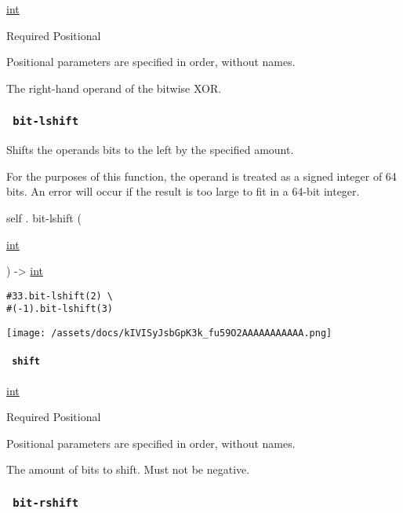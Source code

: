 \href{/docs/reference/foundations/int/}{int}

{Required} {{ Positional }}

\label{definitions-bit-xor-rhs-positional-tooltip}
Positional parameters are specified in order, without names.

The right-hand operand of the bitwise XOR.

\subsubsection{\texorpdfstring{\texttt{\ bit-lshift\ }}{ bit-lshift }}\label{definitions-bit-lshift}

Shifts the operand\textquotesingle s bits to the left by the specified
amount.

For the purposes of this function, the operand is treated as a signed
integer of 64 bits. An error will occur if the result is too large to
fit in a 64-bit integer.

self { . } { bit-lshift } (

{ \href{/docs/reference/foundations/int/}{int} }

) -\textgreater{} \href{/docs/reference/foundations/int/}{int}

\begin{verbatim}
#33.bit-lshift(2) \
#(-1).bit-lshift(3)
\end{verbatim}

\texttt{[image: /assets/docs/kIVISyJsbGpK3k\_fu59O2AAAAAAAAAAA.png]}

\paragraph{\texorpdfstring{\texttt{\ shift\ }}{ shift }}\label{definitions-bit-lshift-shift}

\href{/docs/reference/foundations/int/}{int}

{Required} {{ Positional }}

\label{definitions-bit-lshift-shift-positional-tooltip}
Positional parameters are specified in order, without names.

The amount of bits to shift. Must not be negative.

\subsubsection{\texorpdfstring{\texttt{\ bit-rshift\ }}{ bit-rshift }}\label{definitions-bit-rshift}

